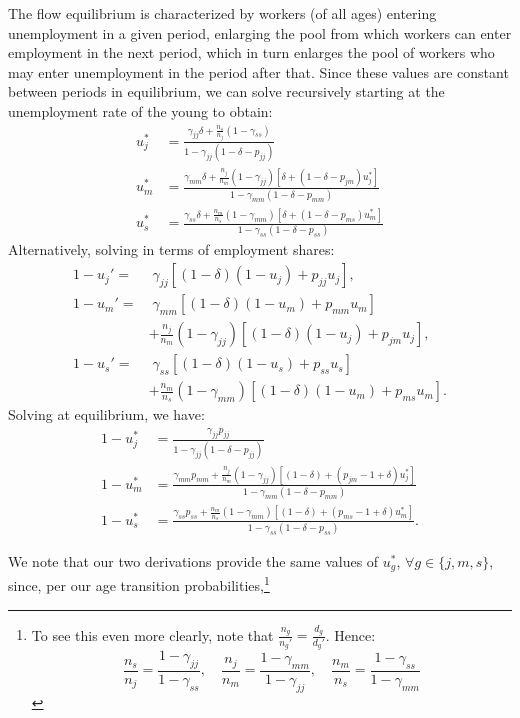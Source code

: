 \documentclass{article}
\begin{document}
The flow equilibrium is characterized by workers (of all ages) entering unemployment in a given period, enlarging the pool from which workers can enter employment in the next period, which in turn enlarges the pool of workers who may enter unemployment in the period after that. Since these values are constant between periods in equilibrium, we can solve recursively starting at the unemployment rate of the young to obtain:
\begin{align*}
u_j^*&=\frac{\gamma_{jj}\delta+\frac{n_s}{n_j}(1-\gamma_{ss})}{1-\gamma_{jj}(1-\delta-p_{jj})}\\
u_m^*&=\frac{\gamma_{mm}\delta+\frac{n_j}{n_m}(1-\gamma_{jj})\left[\delta+(1-\delta-p_{jm})u_j^*\right]}{
1-\gamma_{mm}(1-\delta-p_{mm})}\\
u_s^*&=\frac{\gamma_{ss}\delta+\frac{n_m}{n_s}(1-\gamma_{mm})\left[
\delta+(1-\delta-p_{ms})u_m^*\right]}
{1-\gamma_{ss}(1-\delta-p_{ss})}
\end{align*}
Alternatively, solving in terms of employment shares:
\begin{align*}
1-u_j'
=&\;
\gamma_{jj}
\left[
(1-\delta)(1-u_j)+p_{jj}u_j
\right],
\\
1-u_m'
=&\;
\gamma_{mm}
\left[
(1-\delta)(1-u_m)+p_{mm}u_m
\right]\\
&+\frac{n_j}{n_m}(1-\gamma_{jj})
\left[
(1-\delta)(1-u_j)+p_{jm}u_j
\right],
\\
1-u_s'
=&\;
\gamma_{ss}
\left[
(1-\delta)(1-u_s)+p_{ss}u_s
\right]\\
&+\frac{n_m}{n_s}(1-\gamma_{mm})
\left[
(1-\delta)(1-u_m)+p_{ms}u_m
\right].
\end{align*}
Solving at equilibrium, we have:
\begin{align*}
1-u_j^*
&=
\frac{\gamma_{jj}p_{jj}}
{1-\gamma_{jj}(1-\delta-p_{jj})}\\
1-u_m^*
&=
\frac{
\gamma_{mm}p_{mm}
+\frac{n_j}{n_m}(1-\gamma_{jj})\left[(1-\delta)+(p_{jm}-1+\delta)u_j^*\right]
}
{1-\gamma_{mm}(1-\delta-p_{mm})}\\
1-u_s^*
&=
\frac{
\gamma_{ss}p_{ss}
+\frac{n_m}{n_s}(1-\gamma_{mm})\left[(1-\delta)+(p_{ms}-1+\delta)u_m^*\right]
}
{1-\gamma_{ss}(1-\delta-p_{ss})}.
\end{align*}

We note that our two derivations provide the same values of $u^*_g$, $\forall g\in\{j,m,s\}$, since, per our age transition probabilities,\footnote{To see this even more clearly, note that $\frac{n_g}{n_g'}=\frac{d_g}{d_g'}$. Hence:
\[
    \frac{n_s}{n_j}=\frac{1-\gamma_{jj}}{1-\gamma_{ss}},\quad
    \frac{n_j}{n_m}=\frac{1-\gamma_{mm}}{1-\gamma_{jj}},\quad
    \frac{n_m}{n_s}=\frac{1-\gamma_{ss}}{1-\gamma_{mm}}
\]
} %
\end{document}
